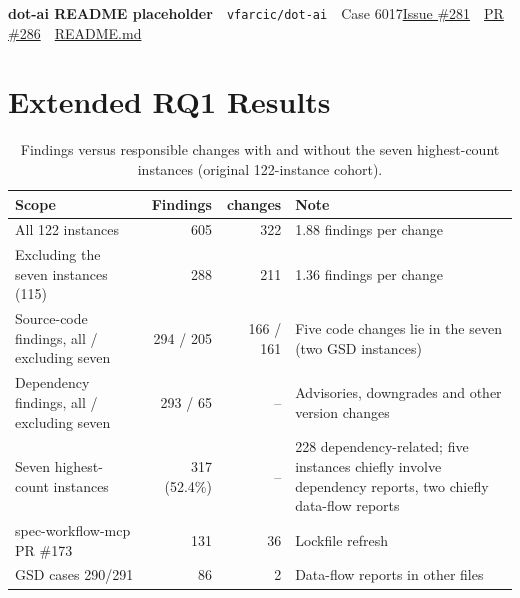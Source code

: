 \begin{casefile}{\textbf{dot-ai README placeholder}\ \ {\scriptsize\texttt{vfarcic/\allowbreak dot-ai}}\ \ {\scriptsize Case 6017}}{\href{https://github.com/vfarcic/dot-ai/issues/281}{Issue \#281}\ \ \href{https://github.com/vfarcic/dot-ai/pull/286}{PR \#286}\ \ \href{https://github.com/vfarcic/dot-ai/blob/466ccaa58eb1b86d2dab07089871102eeb497f49/examples/gateway-api/README.md}{README.md}}
\end{casefile}

\FloatBarrier
\section{Extended RQ1 Results}\label{sec:s4}

\begin{table}[H]
\caption{Findings versus responsible changes with and without the seven highest-count instances (original 122-instance cohort).}
\label{tab:concentration}
\footnotesize\renewcommand{\arraystretch}{1.12}
\begin{tabularx}{\linewidth}{@{}L{5.2cm}rrY@{}}
\toprule
\textbf{Scope} & \textbf{Findings} & \textbf{changes} & \textbf{Note}\\
\midrule
All 122 instances & 605 & 322 & 1.88 findings per change\\
Excluding the seven instances (115) & 288 & 211 & 1.36 findings per change\\
Source-code findings, all / excluding seven & 294 / 205 & 166 / 161 & Five code changes lie in the seven (two GSD instances)\\
Dependency findings, all / excluding seven & 293 / 65 & -- & Advisories, downgrades and other version changes\\
Seven highest-count instances & 317 (52.4\%) & -- & 228 dependency-related; five instances chiefly involve dependency reports, two chiefly data-flow reports\\
spec-workflow-mcp PR \#173 & 131 & 36 & Lockfile refresh\\
GSD cases 290/291 & 86 & 2 & Data-flow reports in other files\\
\bottomrule
\end{tabularx}
\end{table}

